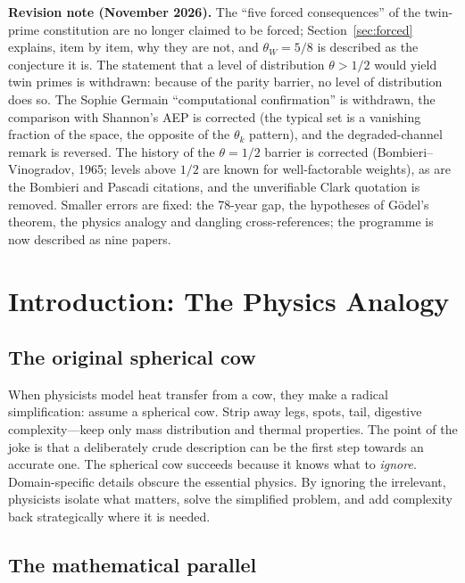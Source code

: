 \documentclass[12pt]{amsart}
\theoremstyle{plain}
\theoremstyle{definition}
\theoremstyle{remark}
\begin{document}
\noindent\textbf{Revision note (November 2026).}
The ``five forced consequences'' of the twin-prime constitution are no longer
claimed to be forced; Section~\ref{sec:forced} explains, item by item, why they
are not, and $\theta_W = 5/8$ is described as the conjecture it is. The
statement that a level of distribution $\theta > 1/2$ would yield twin primes
is withdrawn: because of the parity barrier, no level of distribution does so.
The Sophie Germain ``computational confirmation'' is withdrawn, the comparison
with Shannon's AEP is corrected (the typical set is a vanishing fraction of the
space, the opposite of the $\theta_k$ pattern), and the degraded-channel remark
is reversed. The history of the $\theta = 1/2$ barrier is corrected
(Bombieri--Vinogradov, 1965; levels above $1/2$ are known for well-factorable
weights), as are the Bombieri and Pascadi citations, and the unverifiable Clark
quotation is removed. Smaller errors are fixed: the 78-year gap, the hypotheses
of G\"odel's theorem, the physics analogy and dangling cross-references; the
programme is now described as nine papers.

\tableofcontents

\section{Introduction: The Physics Analogy}

\subsection{The original spherical cow}

When physicists model heat transfer from a cow, they make a radical
simplification: assume a spherical cow. Strip away legs, spots, tail, digestive
complexity---keep only mass distribution and thermal properties. The point of
the joke is that a deliberately crude description can be the first step
towards an accurate one.
The spherical cow succeeds because it knows what to \emph{ignore}. Domain-specific
details obscure the essential physics. By ignoring the irrelevant, physicists
isolate what matters, solve the simplified problem, and add complexity back
strategically where it is needed.

\subsection{The mathematical parallel}
\end{document}
